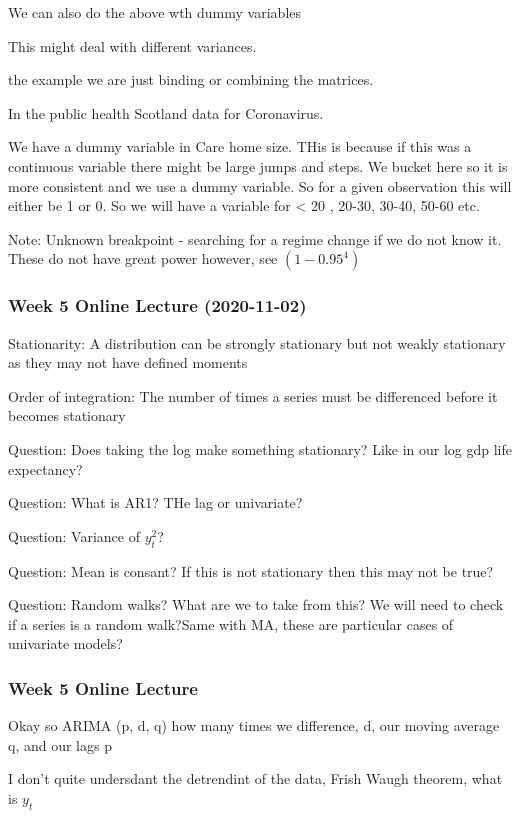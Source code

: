 \documentclass[]{article}
\begin{document}
We can also do the above wth dummy variables

This might deal with different variances.

the example we are just binding or combining the matrices.

In the public health Scotland data for Coronavirus.

We have a dummy variable in Care home size. THis is because if this was
a continuous variable there might be large jumps and steps. We bucket
here so it is more consistent and we use a dummy variable. So for a
given observation this will either be 1 or 0. So we will have a variable
for \textless{} 20 , 20-30, 30-40, 50-60 etc.

Note: Unknown breakpoint - searching for a regime change if we do not
know it. These do not have great power however, see \((1-0.95^4)\)

\subsubsection{Week 5 Online Lecture
(2020-11-02)}\label{week-5-online-lecture-2020-11-02}

Stationarity: A distribution can be strongly stationary but not weakly
stationary as they may not have defined moments

Order of integration: The number of times a series must be differenced
before it becomes stationary

Question: Does taking the log make something stationary? Like in our log
gdp life expectancy?

Question: What is AR1? THe lag or univariate?

Question: Variance of \(y_{t}^2\)?

Question: Mean is consant? If this is not stationary then this may not
be true?

Question: Random walks? What are we to take from this? We will need to
check if a series is a random walk?Same with MA, these are particular
cases of univariate models?

\subsubsection{Week 5 Online Lecture}\label{week-5-online-lecture}

Okay so ARIMA (p, d, q) how many times we difference, d, our moving
average q, and our lags p

I don't quite undersdant the detrendint of the data, Frish Waugh
theorem, what is \(y_t\)
\end{document}
